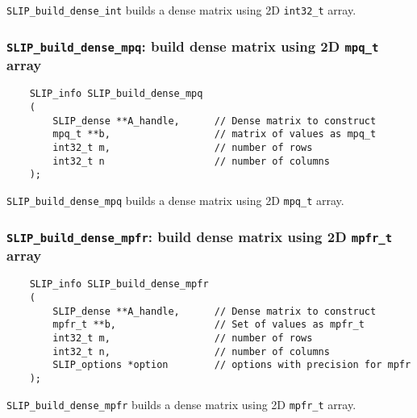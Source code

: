 \documentclass[12pt]{article}
\theoremstyle{definition}
\begin{document}
\verb|SLIP_build_dense_int| builds a dense matrix using 2D \verb|int32_t|
array.

\cprotect\subsubsection{\verb|SLIP_build_dense_mpq|: build dense matrix using 2D \verb|mpq_t| array}
\label{s:user:build_dense_mpq}

\begin{mdframed}[userdefinedwidth=6in]
{\footnotesize
\begin{verbatim}
    SLIP_info SLIP_build_dense_mpq
    (
        SLIP_dense **A_handle,      // Dense matrix to construct
        mpq_t **b,                  // matrix of values as mpq_t
        int32_t m,                  // number of rows
        int32_t n                   // number of columns
    );
\end{verbatim}
} \end{mdframed}

\verb|SLIP_build_dense_mpq| builds a dense matrix using 2D \verb|mpq_t| array.

\cprotect\subsubsection{\verb|SLIP_build_dense_mpfr|: build dense matrix using 2D \verb|mpfr_t| array}
\label{s:user:build_dense_mpfr}

\begin{mdframed}[userdefinedwidth=6in]
{\footnotesize
\begin{verbatim}
    SLIP_info SLIP_build_dense_mpfr
    (
        SLIP_dense **A_handle,      // Dense matrix to construct
        mpfr_t **b,                 // Set of values as mpfr_t
        int32_t m,                  // number of rows
        int32_t n,                  // number of columns
        SLIP_options *option        // options with precision for mpfr
    );
\end{verbatim}
} \end{mdframed}

\verb|SLIP_build_dense_mpfr| builds a dense matrix using 2D \verb|mpfr_t|
array.
\end{document}
